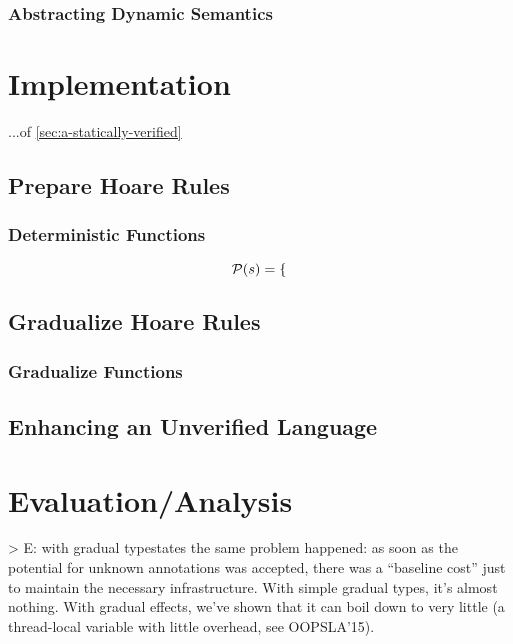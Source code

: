 

\subsection{Abstracting Dynamic Semantics}

\chapter{Implementation}
...of \ref{sec:a-statically-verified}

\section{Prepare Hoare Rules}

\subsection{Deterministic Functions}
\begin{displaymath}
\mathcal{P}(s) =
\begin{cases}

\end{cases}
\end{displaymath}

\section{Gradualize Hoare Rules}

\subsection{Gradualize Functions}

\section{Enhancing an Unverified Language}


\chapter{Evaluation/Analysis}
> E:
with gradual typestates the same problem happened: as soon as the potential for unknown annotations was accepted, there was a “baseline cost” just to maintain the necessary infrastructure.
With simple gradual types, it’s almost nothing. With gradual effects, we’ve shown that it can boil down to very little (a thread-local variable with little overhead, see OOPSLA’15). 

